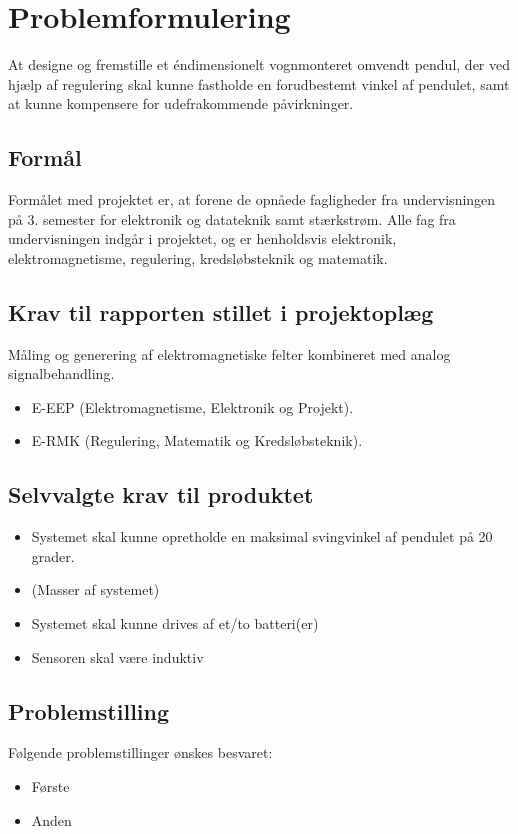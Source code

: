 
\section{Problemformulering}
At designe og fremstille et éndimensionelt vognmonteret omvendt pendul, der ved hjælp af regulering skal kunne fastholde en forudbestemt vinkel af pendulet, samt at kunne kompensere for udefrakommende påvirkninger. 

\subsection{Formål}
Formålet med projektet er, at forene de opnåede fagligheder fra undervisningen på 3. semester for elektronik og datateknik samt stærkstrøm. 
Alle fag fra undervisningen indgår i projektet, og er henholdsvis elektronik, elektromagnetisme, regulering, kredsløbsteknik og matematik.

\subsection{Krav til rapporten stillet i projektoplæg}
Måling og generering af elektromagnetiske felter kombineret med analog signalbehandling.
\begin{itemize}
\item E-EEP (Elektromagnetisme, Elektronik og Projekt).
\item E-RMK (Regulering, Matematik og Kredsløbsteknik).
\end{itemize}

\subsection{Selvvalgte krav til produktet} \label{afs:kravspecifikation}
\begin{itemize}
\item Systemet skal kunne opretholde en maksimal svingvinkel af pendulet på 20 grader.
\item (Masser af systemet)
\item Systemet skal kunne drives af et/to batteri(er)
\item Sensoren skal være induktiv
\end{itemize}

\subsection{Problemstilling}
Følgende problemstillinger ønskes besvaret:
\begin{itemize}
\item Første
\item Anden
\end{itemize}

